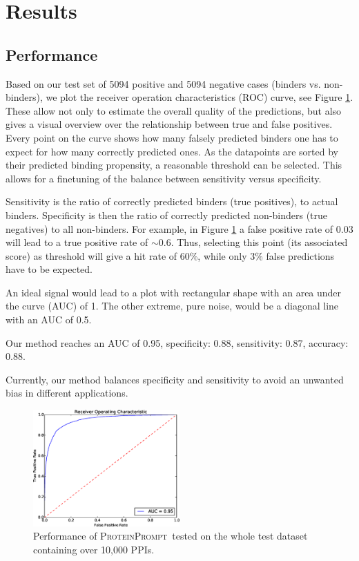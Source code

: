 \documentclass{bioinfo}
\newcommand{\tool}{\textsc{ProteinPrompt}}
\begin{document}
\section{Results}


\subsection{Performance}
\label{performance}

Based on our test set of 5094 positive and 5094 negative cases
(binders vs. non-binders), we plot the receiver operation
characteristics (ROC) curve, see Figure \ref{fig:roc}.
These allow not only to estimate the overall quality of the predictions, but also
gives a visual overview over the relationship between true and false
positives.
Every point on the curve shows how many falsely predicted binders one has to expect for how many correctly predicted ones.
As the datapoints are sorted by their predicted binding propensity, a reasonable threshold can be selected.
This allows for a finetuning of the balance between sensitivity versus specificity.

Sensitivity is the ratio of correctly predicted binders (true positives), to actual binders.
  Specificity is then the ratio of correctly predicted non-binders (true negatives) to all non-binders.
  For example, in Figure \ref{fig:roc} a false positive rate of 0.03 will lead to a true positive rate of $\sim$0.6.
  Thus, selecting this point (its associated score) as threshold will give a hit rate of 60\%, while only 3\% false predictions have to be expected.


An ideal signal would lead to a plot with rectangular shape
with an area under the curve (AUC) of 1. The other extreme, pure noise, would be a diagonal
line with an AUC of 0.5.

Our method reaches an AUC of 0.95,
specificity: 0.88,
sensitivity: 0.87,
accuracy: 0.88.

Currently, our method balances specificity and sensitivity to avoid an
unwanted bias in different applications.

\begin{figure}[t]
\includegraphics[width=0.5\textwidth]{img/meta_final_roc.eps}
\caption{Performance of \tool\  tested on the whole test dataset
  containing over 10,000 PPIs.}
\label{fig:roc}
\end{figure} 
\end{document}
